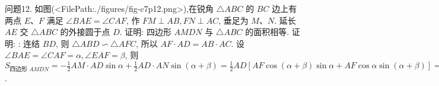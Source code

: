 问题12. 如图(<FilePath:./figures/fig-c7p12.png>),在锐角 $\triangle A B C$ 的 $B C$ 边上有两点 $E 、 F$ 满足 $\angle B A E=\angle C A F$, 作 $F M \perp A B, F N \perp A C$, 垂足为 $M 、 N$. 延长 $A E$ 交 $\triangle A B C$ 的外接圆于点 $D$. 证明: 四边形 $A M D N$ 与 $\triangle A B C$ 的面积相等.
证明: : 连结 $B D$, 则 $\triangle A B D \backsim \triangle A F C$, 所以 $A F \cdot A D=A B \cdot A C$. 设 $\angle B A E=\angle C A F=\alpha, \angle E A F=\beta$, 则 $S_{\text {四边形 } A M D N}=-\frac{1}{2} A M \cdot A D \sin \alpha+ \frac{1}{2} A D \cdot A N \sin (\alpha+\beta)=\frac{1}{2} A D[A F \cos (\alpha+\beta) \sin \alpha+A F \cos \alpha \sin (\alpha+\beta)]= \frac{1}{2} A D \cdot A F \sin (2 \alpha+\beta)=\frac{1}{2} A B \cdot A C \sin \angle B A C=S_{\triangle A B C}$.



